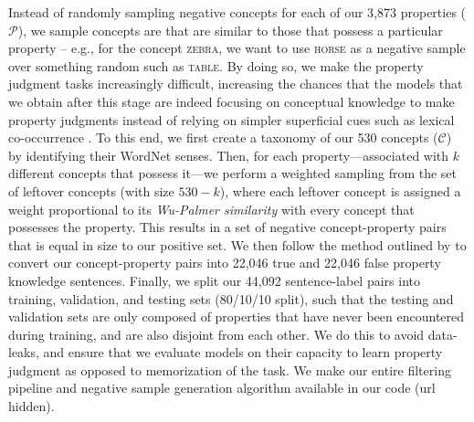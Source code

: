 \documentclass[10pt,letterpaper]{article}
\newcommand{\concepts}{\mathcal{C}}
\newcommand{\properties}{\mathcal{P}}
\begin{document}
Instead of randomly sampling negative concepts for each of our 3{,}873 properties ($\properties$), we sample concepts are that are similar to those that possess a particular property -- e.g., for the concept \textsc{zebra}, we want to use \textsc{horse} as a negative sample over something random such as \textsc{table}.
By doing so, we make the property judgment tasks increasingly difficult, increasing the chances that the models that we obtain after this stage are indeed focusing on conceptual knowledge to make property judgments instead of relying on simpler superficial cues such as lexical co-occurrence \citep{mccoy-etal-2019-right}.  
To this end, we first create a taxonomy of our 530 concepts ($\concepts$) by identifying their WordNet \citep{miller1995wordnet} senses.
Then, for each property---associated with $k$ different concepts that possess it---we perform a weighted sampling from the set of leftover concepts (with size $530 - k$), where each leftover concept is assigned a weight proportional to its \textit{Wu-Palmer similarity} \citep[a commonly used taxonomic similarity computed over the subset of wordnet taxonomy;][]{wu-palmer-1994-verb} with every concept that possesses the property. 
This results in a set of negative concept-property pairs that is equal in size to our positive set.
We then follow the method outlined by \citet{bhatia2020transformer} to convert our concept-property pairs into 22{,}046 true and 22{,}046 false property knowledge sentences.
Finally, we split our 44{,}092 sentence-label pairs into training, validation, and testing sets (80/10/10 split), such that the testing and validation sets are only composed of properties that have never been encountered during training, and are also disjoint from each other. 
We do this to avoid data-leaks, and ensure that we evaluate models on their capacity to learn property judgment as opposed to memorization of the task.
We make our entire filtering pipeline and negative sample generation algorithm available in our code (url hidden).
\end{document}
